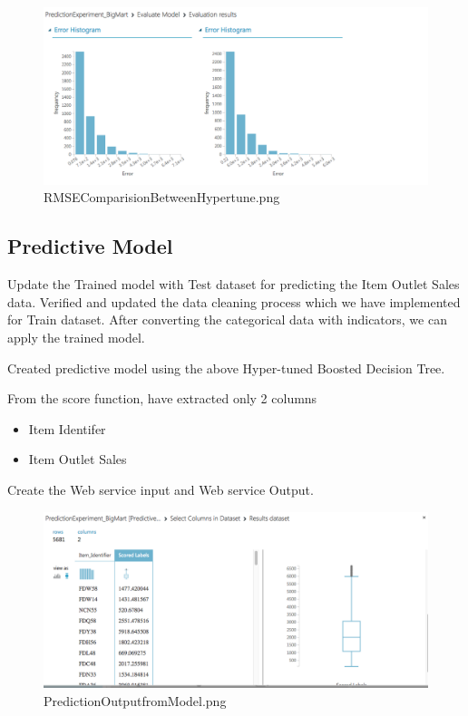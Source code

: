 \begin{figure}[pic4]
	\centering\includegraphics[width=\columnwidth]
{Images/mlstudio/RMSEComparisionBetweenHypertune.png}
	\caption{RMSEComparisionBetweenHypertune.png}
\label{fig:RMSEComparisionBetweenHypertune}
\end{figure}

\subsection{Predictive Model}
Update the Trained model with Test dataset for predicting the Item Outlet 
Sales data. Verified and updated the data cleaning process which we have 
implemented for Train dataset. After converting the categorical data with 
indicators, we can apply the trained model.

Created predictive model using the above Hyper-tuned Boosted Decision Tree.

From the score function, have extracted only 2 columns
\begin{itemize}
\item Item Identifer
\item Item Outlet Sales
\end{itemize}

Create the Web service input and Web service Output.

\begin{figure}[pic5]
	\centering\includegraphics[width=\columnwidth]
{Images/mlstudio/PredictionOutputfromModel.png}
	\caption{PredictionOutputfromModel.png}
\label{fig:PredictionOutputfromModel}
\end{figure}

